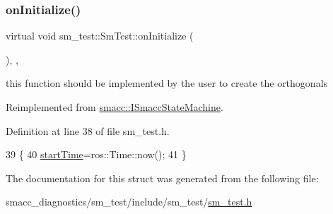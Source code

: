 \subsubsection{\texorpdfstring{on\+Initialize()}{onInitialize()}}
{\footnotesize\ttfamily virtual void sm\+\_\+test\+::\+Sm\+Test\+::on\+Initialize (\begin{DoxyParamCaption}{ }\end{DoxyParamCaption})\hspace{0.3cm}{\ttfamily [inline]}, {\ttfamily [override]}, {\ttfamily [virtual]}}



this function should be implemented by the user to create the orthogonals 



Reimplemented from \hyperlink{classsmacc_1_1ISmaccStateMachine_ac2982c6c8283663e5e1e8a7c82f511ec}{smacc\+::\+I\+Smacc\+State\+Machine}.



Definition at line 38 of file sm\+\_\+test.\+h.


\begin{DoxyCode}
39     \{
40         \hyperlink{namespacesm__test_aa99c742599f6e6c98f883ce4c03f743b}{startTime}=ros::Time::now();
41     \}
\end{DoxyCode}


The documentation for this struct was generated from the following file\+:\begin{DoxyCompactItemize}
\item 
smacc\+\_\+diagnostics/sm\+\_\+test/include/sm\+\_\+test/\hyperlink{sm__test_8h}{sm\+\_\+test.\+h}\end{DoxyCompactItemize}
